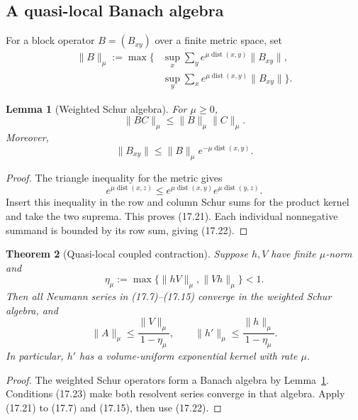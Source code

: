 \documentclass[11pt]{article}
\newtheorem{theorem}{Theorem}[section]
\newtheorem{lemma}[theorem]{Lemma}
\theoremstyle{remark}
\begin{document}
\subsection{A quasi-local Banach algebra}

For a block operator \(B=(B_{xy})\) over a finite metric space, set
\[
\begin{split}
 \|B\|_\mu
 :=\max\bigg\{&
 \sup_x\sum_y e^{\mu\operatorname{dist}(x,y)}\|B_{xy}\|,\\
 &\sup_y\sum_x e^{\mu\operatorname{dist}(x,y)}\|B_{xy}\|
 \bigg\}.
\end{split}                                                  \tag{17.20}
\]

\begin{lemma}[Weighted Schur algebra]
\label{lem:v12v17-schur}
For \(\mu\ge0\),
\[
                         \|BC\|_\mu\le\|B\|_\mu\|C\|_\mu.   \tag{17.21}
\]
Moreover,
\[
                         \|B_{xy}\|
 \le\|B\|_\mu e^{-\mu\operatorname{dist}(x,y)}.             \tag{17.22}
\]
\end{lemma}

\begin{proof}
The triangle inequality for the metric gives
\[
 e^{\mu\operatorname{dist}(x,z)}
 \le
 e^{\mu\operatorname{dist}(x,y)}
 e^{\mu\operatorname{dist}(y,z)}.
\]
Insert this inequality in the row and column Schur sums for the
product kernel and take the two suprema.  This proves (17.21).
Each individual nonnegative summand is bounded by its row sum,
giving (17.22).
\end{proof}

\begin{theorem}[Quasi-local coupled contraction]
\label{thm:v12v17-local}
Suppose \(h,V\) have finite \(\mu\)-norm and
\[
 \eta_\mu:=
 \max\{\|hV\|_\mu,\|Vh\|_\mu\}<1.                          \tag{17.23}
\]
Then all Neumann series in (17.7)--(17.15) converge in the weighted
Schur algebra, and
\[
 \|A\|_\mu\le
 \frac{\|V\|_\mu}{1-\eta_\mu},\qquad
 \boxed{
 \|h'\|_\mu\le\frac{\|h\|_\mu}{1-\eta_\mu}.}                \tag{17.24}
\]
In particular, \(h'\) has a volume-uniform exponential kernel with
rate \(\mu\).
\end{theorem}

\begin{proof}
The weighted Schur operators form a Banach algebra by
Lemma~\ref{lem:v12v17-schur}.  Conditions (17.23) make both resolvent
series converge in that algebra.  Apply (17.21) to (17.7) and
(17.15), then use (17.22).
\end{proof}
\end{document}
